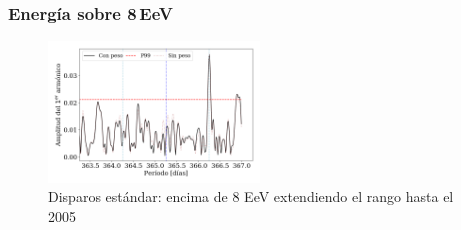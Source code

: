 \subsubsection{Energía sobre 8\,EeV}


\begin{figure}[H]
	\centering
	\includegraphics[width=0.5\textwidth]{2019_Main_Array_8_EeV_con_vs_sin_peso_extended.png}
	\caption{Disparos estándar: encima de 8 EeV extendiendo el rango hasta el 2005}
	\label{fig:8w_extended}
\end{figure}



